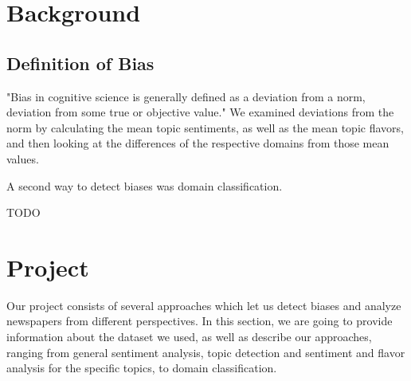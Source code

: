 \documentclass[final]{ieee}
\begin{document}

            
            
\section{Background}\label{sec:background}

\subsection{Definition of Bias}\label{sec:definition}
"Bias in cognitive science is generally defined as a deviation from a norm, deviation from some true or objective value."
We examined deviations from the norm by calculating the mean topic sentiments, as well as the mean topic flavors, and then looking at the differences of the respective domains from those mean values.

A second way to detect biases was domain classification.
 
TODO
%            
%


\section{Project}\label{sec:project}

Our project consists of several approaches which let us detect biases and analyze newspapers from different perspectives. In this section, we are going to provide information about the dataset we used, as well as describe our approaches, ranging from general sentiment analysis, topic detection and sentiment and flavor analysis for the specific topics, to domain classification.
\end{document}
